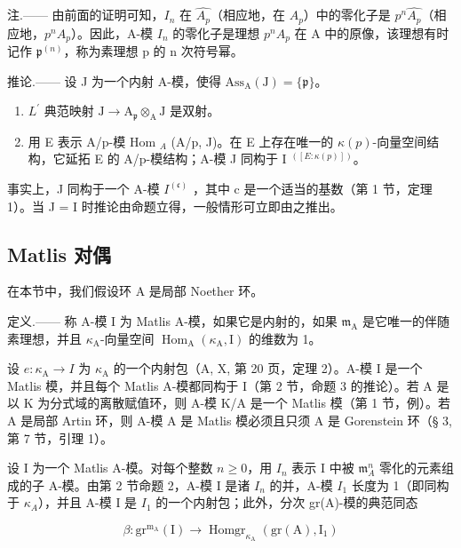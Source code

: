 注.—— 由前面的证明可知，\(I_{n}\) 在 \(\widehat{A_{p}}\)（相应地，在 \(A_{p}\)）中的零化子是 \(p^{n}\widehat{A_{p}}\)（相应地，\(p^{n}A_{p}\)）。因此，A-模 \(I_{n}\) 的零化子是理想 \(p^{n}A_{p}\) 在 A 中的原像，该理想有时记作 \(\mathfrak{p}^{(n)}\)，称为素理想 p 的 n 次符号幂。

推论.—— 设 J 为一个内射 A-模，使得 \(\mathrm{Ass}_{\mathrm{A}}(\mathrm{J}) = \{\mathfrak{p}\}\)。

\begin{enumerate}
\def\labelenumi{\alph{enumi})}
\item
  \(L^{\prime}\) 典范映射 \(\mathrm{J} \to \mathrm{A}_{\mathfrak{p}} \otimes_{\mathrm{A}} \mathrm{J}\) 是双射。
\item
  用 E 表示 A/p-模 Hom \(_A\) (A/p, J)。在 E 上存在唯一的 \(\kappa(p)\)-向量空间结构，它延拓 E 的 A/p-模结构；A-模 J 同构于 I \(^{([E:\kappa(p)])}\)。
\end{enumerate}

事实上，J 同构于一个 A-模 \(I^{(\mathfrak{c})}\) ，其中 c 是一个适当的基数（第 1 节，定理 1）。当 J = I 时推论由命题立得，一般情形可立即由之推出。

\subsection{Matlis 对偶}

在本节中，我们假设环 A 是局部 Noether 环。

定义.—— 称 A-模 I 为 Matlis A-模，如果它是内射的，如果 \(\mathfrak{m}_{\mathrm{A}}\) 是它唯一的伴随素理想，并且 \(\kappa_{\mathrm{A}}\)-向量空间 \(\operatorname{Hom}_{\mathrm{A}}(\kappa_{\mathrm{A}}, \mathrm{I})\) 的维数为 1。

设 \(e: \kappa_{\mathrm{A}} \to I\) 为 \(\kappa_{\mathrm{A}}\) 的一个内射包（A, X, 第 20 页，定理 2）。A-模 I 是一个 Matlis 模，并且每个 Matlis A-模都同构于 I（第 2 节，命题 3 的推论）。若 A 是以 K 为分式域的离散赋值环，则 A-模 K/A 是一个 Matlis 模（第 1 节，例）。若 A 是局部 Artin 环，则 A-模 A 是 Matlis 模必须且只须 A 是 Gorenstein 环（§ 3, 第 7 节，引理 1）。

设 I 为一个 Matlis A-模。对每个整数 \(n \geqslant 0\)，用 \(I_n\) 表示 I 中被 \(\mathfrak{m}_A^n\) 零化的元素组成的子 A-模。由第 2 节命题 2，A-模 I 是诸 \(I_n\) 的并，A-模 \(I_1\) 长度为 1（即同构于 \(\kappa_A\)），并且 A-模 I 是 \(I_1\) 的一个内射包；此外，分次 gr(A)-模的典范同态

\[
\beta : \mathrm{gr} ^ {\mathrm{m} _ {\mathrm{A}}} (\mathrm{I}) \longrightarrow \operatorname{Homgr} _ {\kappa_ {\mathrm{A}}} (\mathrm{gr} (\mathrm{A}), \mathrm{I} _ {1})\tag{3}
\]

